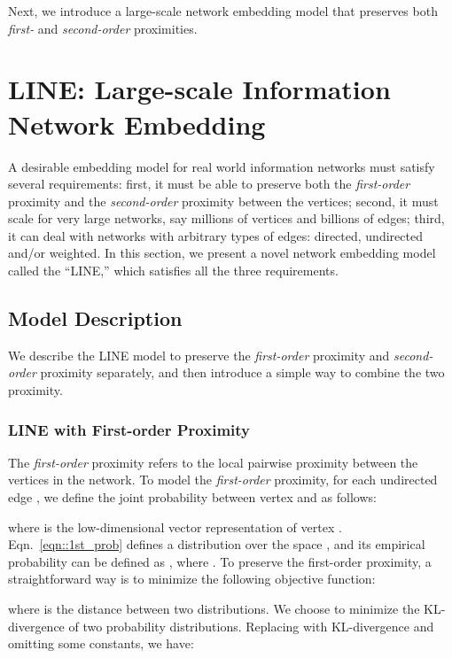 \documentclass{sig-alternate-2013}
\begin{document}
Next, we introduce a large-scale network embedding model that preserves both \emph{first-} and \emph{second-order} proximities. 


\section{LINE: Large-scale Information \\ Network Embedding}
\label{sec::model}

A desirable embedding model for real world information networks must satisfy several requirements: first, it must be able to preserve both the \emph{first-order} proximity and the \emph{second-order} proximity between the vertices; second, it must scale for very large networks, say millions of vertices and billions of edges; third, it can deal with networks with arbitrary types of edges: directed, undirected and/or weighted. In this section, we present a novel network embedding model called the ``LINE,'' which satisfies all the three requirements. 

\subsection{Model Description}
\label{sec::model_description}
We describe the LINE model to preserve the \emph{first-order} proximity and \emph{second-order} proximity separately, and then introduce a simple way to combine the two proximity. 

\subsubsection{LINE with First-order Proximity}

The \emph{first-order} proximity refers to the local pairwise proximity between the vertices in the network. To model the \emph{first-order} proximity, for each undirected edge , we define the joint probability between vertex  and  as follows:

where  is the low-dimensional vector representation of vertex . Eqn.~\eqref{eqn::1st_prob} defines a distribution  over the space , and its empirical probability can be defined as , where . To preserve the first-order proximity, a straightforward way is to minimize the following objective function:

where  is the distance between two distributions.  We choose to minimize the KL-divergence of two probability distributions. Replacing  with KL-divergence and omitting some constants, we have: 
 
\end{document}

